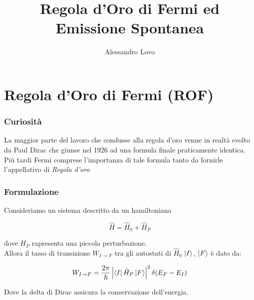 \documentclass{beamer}
\title[ROF \& ES]{Regola d'Oro di Fermi ed Emissione Spontanea}
\author{Alessandro Lovo}
\begin{document}
\begin{frame}
  \maketitle
\end{frame}

\section{Regola d'Oro di Fermi (ROF)}
\begin{frame}
  \frametitle{Curiosità}
  La maggior parte del lavoro che condusse alla regola d'oro venne in realtà svolto da Paul Dirac che giunse nel 1926 ad una formula finale praticamente identica.
  Più tardi Fermi comprese l'importanza di tale formula tanto da fornirle l'appellativo di \emph{Regola d'oro}

\end{frame}

\begin{frame}
  \frametitle{Formulazione}
  Consideriamo un sistema descritto da un hamiltoniana

  \begin{equation*}
    \hat{H} = \hat{H}_0 + \hat{H}_P
  \end{equation*}

  dove $H_P$ rapresenta una piccola perturbazione.\\
  Allora il tasso di transizione $W_{I \to F}$ tra gli autostati di $\hat{H}_0$ $\ket{I}$, $\ket{F}$ è dato da:

  \begin{equation*}
    W_{I \to F} = \frac{2\pi}{\hbar} \left| \bra{I} \hat{H}_P \ket{F} \right|^2 \delta(E_F - E_I)
  \end{equation*}

  Dove la delta di Dirac assicura la conservazione dell'energia.
\end{frame}
\end{document}
